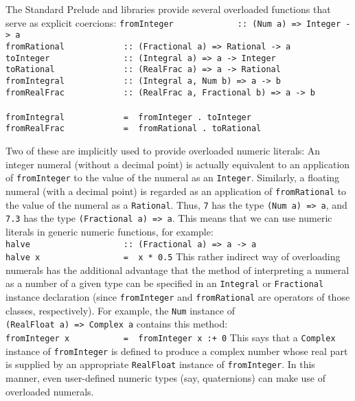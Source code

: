 The Standard Prelude and libraries provide several overloaded functions
that serve as explicit coercions:
\bprog
\mbox{\tt fromInteger\ \ \ \ \ \ \ \ \ \ \ \ \ ::\ (Num\ a)\ =>\ Integer\ ->\ a}\\
\mbox{\tt fromRational\ \ \ \ \ \ \ \ \ \ \ \ ::\ (Fractional\ a)\ =>\ Rational\ ->\ a}\\
\mbox{\tt toInteger\ \ \ \ \ \ \ \ \ \ \ \ \ \ \ ::\ (Integral\ a)\ =>\ a\ ->\ Integer}\\
\mbox{\tt toRational\ \ \ \ \ \ \ \ \ \ \ \ \ \ ::\ (RealFrac\ a)\ =>\ a\ ->\ Rational}\\
\mbox{\tt fromIntegral\ \ \ \ \ \ \ \ \ \ \ \ ::\ (Integral\ a,\ Num\ b)\ =>\ a\ ->\ b}\\
\mbox{\tt fromRealFrac\ \ \ \ \ \ \ \ \ \ \ \ ::\ (RealFrac\ a,\ Fractional\ b)\ =>\ a\ ->\ b}\\
\mbox{\tt }\\[-8pt]
\mbox{\tt fromIntegral\ \ \ \ \ \ \ \ \ \ \ \ =\ \ fromInteger\ .\ toInteger}\\
\mbox{\tt fromRealFrac\ \ \ \ \ \ \ \ \ \ \ \ =\ \ fromRational\ .\ toRational}
\eprog

Two of these are implicitly used to provide overloaded numeric literals:
An integer numeral (without a decimal point) is actually equivalent to
an application of \mbox{\tt fromInteger} to the value of the numeral as an
\mbox{\tt Integer}.  Similarly, a floating numeral (with a decimal point) is
regarded as an application of \mbox{\tt fromRational} to the value of the
numeral as a \mbox{\tt Rational}.  Thus, \mbox{\tt 7} has the type \mbox{\tt (Num\ a)\ =>\ a},
and \mbox{\tt 7.3} has the type \mbox{\tt (Fractional\ a)\ =>\ a}.  This means that we
can use numeric literals in generic numeric functions, for example:
\bprog
\mbox{\tt halve\ \ \ \ \ \ \ \ \ \ \ \ \ \ \ \ \ \ \ ::\ (Fractional\ a)\ =>\ a\ ->\ a}\\
\mbox{\tt halve\ x\ \ \ \ \ \ \ \ \ \ \ \ \ \ \ \ \ =\ \ x\ *\ 0.5}
\eprog
This rather indirect way of overloading numerals has the additional
advantage that the method of interpreting a numeral as a number
of a given type can be specified in an \mbox{\tt Integral} or \mbox{\tt Fractional}
instance declaration (since \mbox{\tt fromInteger} and \mbox{\tt fromRational} are
operators of those classes, respectively).  For example, the
\mbox{\tt Num} instance of \mbox{\tt (RealFloat\ a)\ =>\ Complex\ a} contains this method:
\bprog
\mbox{\tt fromInteger\ x\ \ \ \ \ \ \ \ \ \ \ =\ \ fromInteger\ x\ :+\ 0}
\eprog
This says that a \mbox{\tt Complex} instance of \mbox{\tt fromInteger} is defined to
produce a complex number whose real part is supplied by an appropriate
\mbox{\tt RealFloat} instance of \mbox{\tt fromInteger}.  In this manner, even
user-defined numeric types (say, quaternions) can make use of
overloaded numerals.

